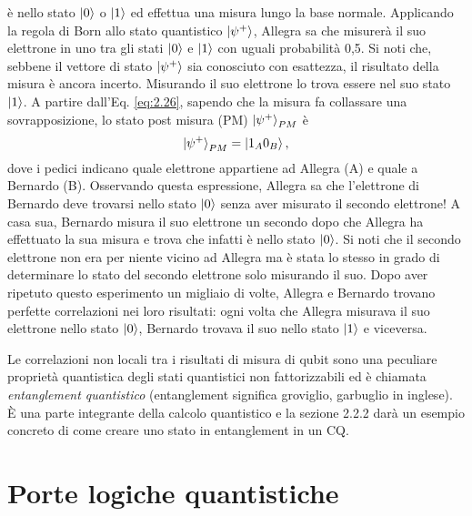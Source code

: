 è nello stato $\ket{0}$ o $\ket{1}$ ed effettua una misura lungo la base 
normale. Applicando la regola di Born allo stato quantistico $\ket{\psi^+}$, 
Allegra sa che misurerà il suo elettrone in uno tra gli stati $\ket{0}$ e 
$\ket{1}$ con uguali probabilità 0,5. Si noti che, sebbene il vettore di stato 
$\ket{\psi^+}$ sia conosciuto con esattezza, il risultato della misura è 
ancora incerto. Misurando il suo elettrone lo trova essere nel suo stato 
$\ket{1}$. A partire dall'Eq. \ref{eq:2.26}, sapendo che la misura fa 
collassare una sovrapposizione, lo stato post misura (PM) %
$\ket{\psi^+}_{PM}$ è 
\begin{equation} \label{eq:2.27}
    \ket{\psi^+}_{PM} = \ket{1_A 0_B}, 
\end{equation}
dove i pedici indicano quale elettrone appartiene ad Allegra (A) e quale a 
Bernardo (B). Osservando questa espressione, Allegra sa che l'elettrone di 
Bernardo deve trovarsi nello stato $\ket{0}$ senza aver misurato il secondo 
elettrone! A casa sua, Bernardo misura il suo elettrone un secondo dopo che 
Allegra ha effettuato la sua misura e trova che infatti è nello stato $\ket{0}$. 
Si noti che il secondo elettrone non era per niente vicino ad Allegra ma è stata 
lo stesso in grado di determinare lo stato del secondo elettrone solo misurando 
il suo. Dopo aver ripetuto questo esperimento un migliaio di volte, Allegra e 
Bernardo trovano perfette correlazioni nei loro risultati: ogni volta che Allegra 
misurava il suo elettrone nello stato $\ket{0}$, Bernardo trovava il suo nello 
stato $\ket{1}$ e viceversa. 

Le correlazioni non locali tra i risultati di misura di qubit sono una peculiare 
proprietà quantistica degli stati quantistici non fattorizzabili ed è chiamata 
\emph{entanglement quantistico} (entanglement significa groviglio, garbuglio 
in inglese). 
È una parte integrante della calcolo quantistico e la sezione 2.2.2 darà un 
esempio concreto di come creare uno stato in entanglement in un \ac{CQ}. 

\section{Porte logiche quantistiche}

